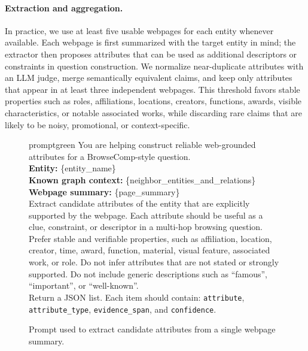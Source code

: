 \paragraph{Extraction and aggregation.}
In practice, we use at least five usable webpages for each entity whenever available. Each webpage is first summarized with the target entity in mind; the extractor then proposes attributes that can be used as additional descriptors or constraints in question construction. We normalize near-duplicate attributes with an LLM judge, merge semantically equivalent claims, and keep only attributes that appear in at least three independent webpages. This threshold favors stable properties such as roles, affiliations, locations, creators, functions, awards, visible characteristics, or notable associated works, while discarding rare claims that are likely to be noisy, promotional, or context-specific.

\clearpage
\onecolumn
\begin{figure}[H]
\centering
\begin{promptbox}{promptgreen}
You are helping construct reliable web-grounded attributes for a BrowseComp-style question.\\
\textbf{Entity:} \{entity\_name\}\\
\textbf{Known graph context:} \{neighbor\_entities\_and\_relations\}\\
\textbf{Webpage summary:} \{page\_summary\}\\[2pt]
Extract candidate attributes of the entity that are explicitly supported by the webpage. Each attribute should be useful as a clue, constraint, or descriptor in a multi-hop browsing question. Prefer stable and verifiable properties, such as affiliation, location, creator, time, award, function, material, visual feature, associated work, or role. Do not infer attributes that are not stated or strongly supported. Do not include generic descriptions such as ``famous'', ``important'', or ``well-known''.\\[2pt]
Return a JSON list. Each item should contain:
\texttt{attribute}, \texttt{attribute\_type}, \texttt{evidence\_span}, and \texttt{confidence}.
\end{promptbox}
\caption{Prompt used to extract candidate attributes from a single webpage summary.}
\label{fig:web-attr-extract-prompt}
\end{figure}

